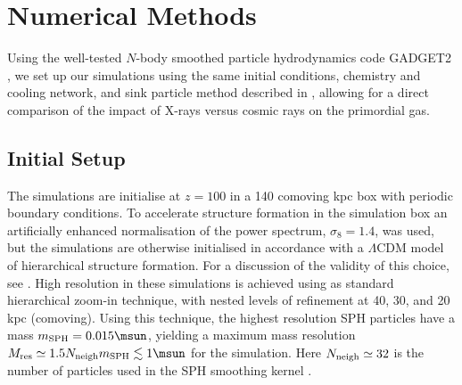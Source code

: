 \section{Numerical Methods}
\label{methods}
Using the well-tested $N$-body smoothed particle hydrodynamics code GADGET2 \citep{Springel2005}, we set up our simulations using the same initial conditions, chemistry and cooling network, and sink particle method described in \citet{Hummeletal2014}, allowing for a direct comparison of the impact of X-rays versus cosmic rays on the primordial gas. 

\subsection{Initial Setup}
\label{setup}
The simulations are initialise at $z=100$ in a 140 comoving kpc box with periodic boundary conditions. To accelerate structure formation in the simulation box an artificially enhanced normalisation of the power spectrum, $\sigma_8 = 1.4$, was used, but the simulations are otherwise initialised in accordance with a $\Lambda$CDM model of hierarchical structure formation. For a discussion of the validity of this choice, see \citet{StacyGreifBromm2010}. High resolution in these simulations is achieved using as standard hierarchical zoom-in technique, with nested levels of refinement at 40, 30, and 20 kpc (comoving).  Using this technique, the highest resolution SPH particles have a mass $m_{\rm SPH} = 0.015\msun$, yielding a maximum mass resolution $M_{\rm res} \simeq 1.5 N_{\rm neigh} m_{\rm SPH} \lesssim 1\msun$ for the simulation.  Here $N_{\rm neigh} \simeq 32$ is the number of particles used in the SPH smoothing kernel \citep{BateBurkert1997}.
